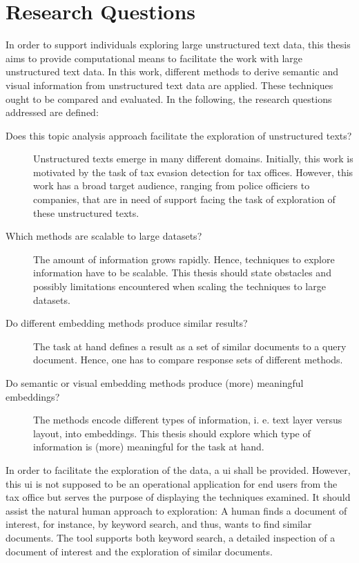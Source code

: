 \section{Research Questions}\label{sec:research-questions}

In order to support individuals exploring large unstructured text data, 
this thesis aims to provide computational means to facilitate the work with large unstructured text data.
In this work, different methods to derive semantic and visual information from unstructured text data are applied.
These techniques ought to be compared and evaluated.
In the following, the research questions addressed are defined:
\begin{description}
    \item[Does this topic analysis approach facilitate the exploration of unstructured texts?]
    Unstructured texts emerge in many different domains.
    Initially, this work is motivated by the task of tax evasion detection for tax offices.
    However, this work has a broad target audience, ranging from police officiers to companies, 
    that are in need of support facing the task of exploration of these unstructured texts.

    \item[Which methods are scalable to large datasets?]
    The amount of information grows rapidly.
    Hence, techniques to explore information have to be scalable.
    This thesis should state obstacles and possibly limitations encountered when scaling the techniques to large datasets.

    \item[Do different embedding methods produce similar results?]
    The task at hand defines a result as a set of similar documents to a query document.
    Hence, one has to compare response sets of different methods.

    \item[Do semantic or visual embedding methods produce (more) meaningful embeddings?]
    The methods encode different types of information, i. e. text layer versus layout, into embeddings. 
    This thesis should explore which type of information is (more) meaningful for the task at hand.


\end{description}


In order to facilitate the exploration of the data, a \ac{ui} shall be provided.
However, this \ac{ui} is not supposed to be an operational application for end users from the tax office 
but serves the purpose of displaying the techniques examined.
It should assist the natural human approach to exploration:
A human finds a document of interest, for instance, by keyword search, and thus, wants to find similar documents.
The tool supports both keyword search, a detailed inspection of a document of interest and the exploration of similar documents.

